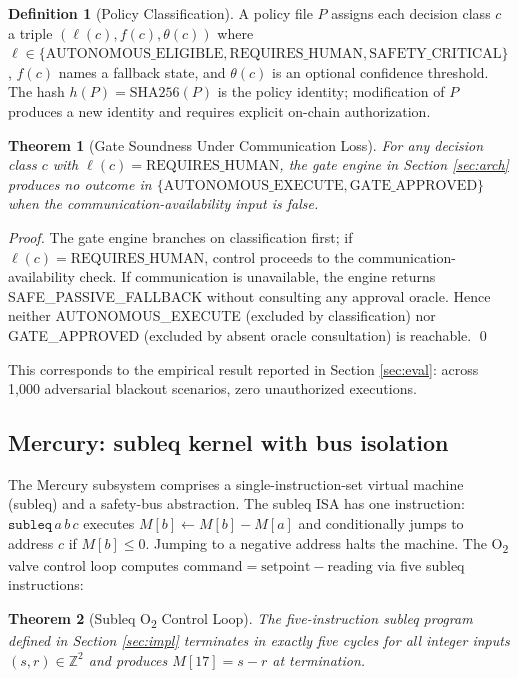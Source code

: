 \documentclass[conference]{IEEEtran}
\theoremstyle{definition}
\newtheorem{definition}{Definition}
\theoremstyle{plain}
\newtheorem{theorem}{Theorem}
\theoremstyle{remark}
\begin{document}
\begin{definition}[Policy Classification]
\label{def:policy}
A policy file $P$ assigns each decision class $c$ a triple $(\ell(c), f(c), \theta(c))$ where $\ell \in \{\text{AUTONOMOUS\_ELIGIBLE}, \text{REQUIRES\_HUMAN}, \text{SAFETY\_CRITICAL}\}$, $f(c)$ names a fallback state, and $\theta(c)$ is an optional confidence threshold. The hash $h(P) = \text{SHA256}(P)$ is the policy identity; modification of $P$ produces a new identity and requires explicit on-chain authorization.
\end{definition}

\begin{theorem}[Gate Soundness Under Communication Loss]
\label{thm:gate}
For any decision class $c$ with $\ell(c) = \text{REQUIRES\_HUMAN}$, the gate engine in Section \ref{sec:arch} produces no outcome in $\{\text{AUTONOMOUS\_EXECUTE}, \text{GATE\_APPROVED}\}$ when the communication-availability input is false.
\end{theorem}

\begin{proof}
The gate engine branches on classification first; if $\ell(c) = \text{REQUIRES\_HUMAN}$, control proceeds to the communication-availability check. If communication is unavailable, the engine returns SAFE\_PASSIVE\_FALLBACK without consulting any approval oracle. Hence neither AUTONOMOUS\_EXECUTE (excluded by classification) nor GATE\_APPROVED (excluded by absent oracle consultation) is reachable. \qed
\end{proof}

This corresponds to the empirical result reported in Section \ref{sec:eval}: across 1{,}000 adversarial blackout scenarios, zero unauthorized executions.

\subsection{Mercury: subleq kernel with bus isolation}

The Mercury subsystem comprises a single-instruction-set virtual machine (subleq) and a safety-bus abstraction. The subleq ISA has one instruction: $\texttt{subleq}\,a\,b\,c$ executes $M[b] \leftarrow M[b] - M[a]$ and conditionally jumps to address $c$ if $M[b] \leq 0$. Jumping to a negative address halts the machine. The O\textsubscript{2} valve control loop computes $\text{command} = \text{setpoint} - \text{reading}$ via five subleq instructions:

\begin{theorem}[Subleq O\textsubscript{2} Control Loop]
\label{thm:subleq}
The five-instruction subleq program defined in Section \ref{sec:impl} terminates in exactly five cycles for all integer inputs $(s, r) \in \mathbb{Z}^2$ and produces $M[17] = s - r$ at termination.
\end{theorem}
\end{document}
